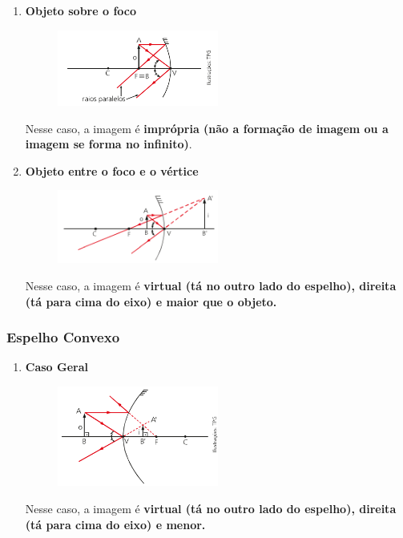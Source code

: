\documentclass[12pt]{extarticle}
\newcommand{\<}{\langle}
\renewcommand{\>}{\rangle}
\theoremstyle{definition}
\begin{document}
\begin{enumerate}
    \item \textbf{Objeto sobre o foco}
    \begin{figure}[H]
        \centering
        \includegraphics[width=0.5\textwidth]{concavo_caso_4.png}
        \label{fig:concavo_caso_4}
    \end{figure}
    Nesse caso, a imagem é \textbf{imprópria (não a formação de imagem ou a imagem se forma no infinito)}.
    
    \item \textbf{Objeto entre o foco e o vértice}
    \begin{figure}[H]
        \centering
        \includegraphics[width=0.5\textwidth]{concavo_caso_5.png}
        \label{fig:concavo_caso_5}
    \end{figure}
    Nesse caso, a imagem é \textbf{virtual (tá no outro lado do espelho), direita (tá para cima do eixo) e maior que o objeto.}
\end{enumerate}

\subsubsection{Espelho Convexo}
\begin{enumerate}
    \item \textbf{Caso Geral}
    \begin{figure}[H]
        \centering
        \includegraphics[width=0.5\textwidth]{convexo_caso.png}
        \label{fig:convexo_caso_geral}
    \end{figure}
    Nesse caso, a imagem é \textbf{virtual (tá no outro lado do espelho), direita (tá para cima do eixo) e menor.}
\end{enumerate}
\end{document}
